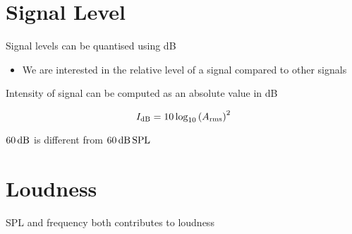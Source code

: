 \section{Signal Level}

  Signal levels can be quantised using dB

  \begin{itemize}
    \item We are interested in the relative level of a signal compared to
    other signals
  \end{itemize}

  Intensity of signal can be computed as an absolute value in dB

  \begin{equation}
    I_{\operatorname{dB}} = 10 \log_{10} \left( A_{\operatorname{rms}} \right)^{2}
  \end{equation}

  $ 60 \operatorname{dB} $ is different from $ 60 \operatorname{dB} \operatorname{SPL} $

\section{Loudness}

  SPL and frequency both contributes to loudness
